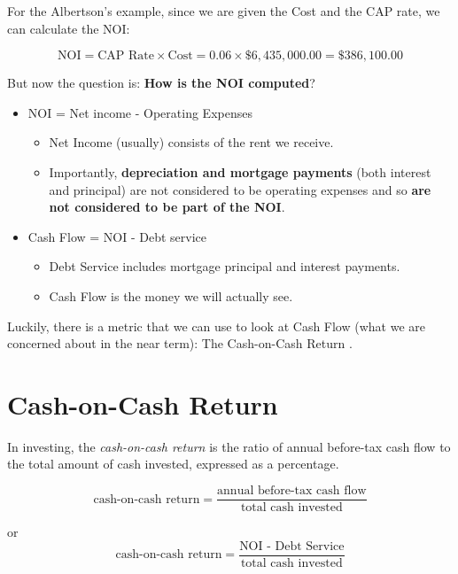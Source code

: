 \documentclass[11pt, oneside]{article}   	%
\theoremstyle{definition}
\begin{document}
 

\bigskip
\noindent
For the Albertson's example, since we are given the Cost and the CAP rate, we can calculate the NOI:

\begin{equation*}
\text{NOI} = \text {CAP Rate} \times \text{Cost} = 0.06 \times \$6,435,000.00 = \$386,100.00
\end{equation*}

\bigskip
\noindent
But now the question is: \textbf{How is the NOI computed}?

\begin{itemize}
\item NOI = Net income - Operating Expenses
\begin{itemize}
\item Net Income (usually) consists of the rent we receive.
\item Importantly, \textbf{depreciation and mortgage payments} (both interest and principal) are not considered to be operating expenses and so \textbf{are not considered
to be part of the NOI}.
\end{itemize}
\item Cash Flow = NOI - Debt service
\begin{itemize}
\item Debt Service includes mortgage principal and interest payments.
\item Cash Flow is the money we will actually see.
\end{itemize}
\end{itemize}

\bigskip
\noindent
Luckily, there is a metric that we can use to look at Cash Flow (what we are concerned about in the near term): The Cash-on-Cash Return \cite{wiki:cash_on_cash}.

\section{Cash-on-Cash Return}
In investing, the \emph{cash-on-cash return} is the ratio of annual before-tax cash flow to the total amount of cash invested, expressed as a percentage.

\bigskip
\begin{equation*}
\text{cash-on-cash return} = \frac {\text{annual before-tax cash flow}}{\text{total cash invested}}
\end{equation*}

\bigskip
\noindent
or
\begin{equation}
\text{cash-on-cash return} =  \frac {\text{NOI - Debt Service}}{\text{total cash invested}}
\label{eqn:c-on-c}
\end{equation}
\end{document}
